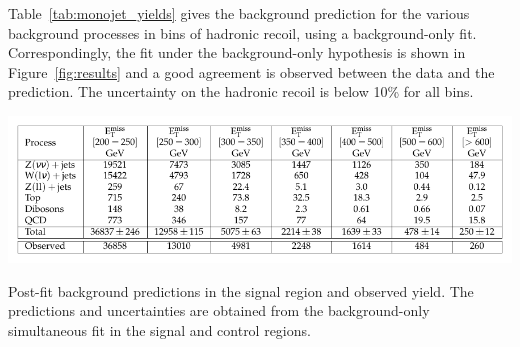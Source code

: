 % 

Table~\ref{tab:monojet_yields} gives the background prediction for the various background processes in bins of hadronic recoil, using a background-only fit. Correspondingly, the fit under the background-only hypothesis is shown in Figure~\ref{fig:results} and a good agreement is observed between the data and the prediction. The uncertainty on the hadronic recoil is below 10\% for all bins.

\begin{table}[ht]
  \centering
 \includegraphics[width=\textwidth]{yields.pdf} 
 \caption{Post-fit background predictions in the signal region and observed yield. The predictions and uncertainties are obtained from the background-only simultaneous fit in the signal and control regions.}
 \label{tab:monojet_yields}
\end{table}

